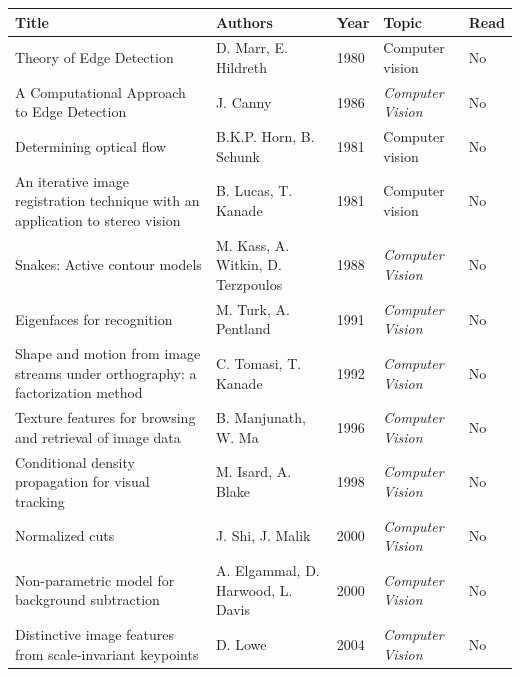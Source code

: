 \documentclass[idxtotoc,hyperref,openany]{labbook} %
\begin{document}
\begin{table}[h!]
\hspace{-2.5cm}
\centering
\renewcommand{\arraystretch}{1.5}
 \small
\begin{tabular}{@{}p{6cm} p{4cm} p{1cm} p{3cm} p{1cm}} \toprule
\textbf{Title}		&	\textbf{Authors}	&	\textbf{Year}		&	\textbf{Topic}		& 	\textbf{Read}\\ \midrule
Theory of Edge Detection	&	D. Marr, E. Hildreth	&	1980	&	Computer vision	& No \\
A Computational Approach to Edge Detection & J. Canny & 1986 & \emph{Computer Vision} & No \\
Determining optical flow	&	B.K.P. Horn, B. Schunk	&	1981	&	Computer vision	&	No \\
An iterative image registration technique with an application to stereo vision	&	B. Lucas, T. Kanade	& 1981 &	Computer vision	&	No \\
Snakes: Active contour models	&	M. Kass, A. Witkin, D. Terzpoulos	&	1988 & \emph{Computer Vision} & No \\
Eigenfaces for recognition & M. Turk, A. Pentland & 1991 & \emph{Computer Vision} & No \\
Shape and motion from image streams under orthography: a factorization method & C. Tomasi, T. Kanade & 1992 & \emph{Computer Vision} & No \\
Texture features for browsing and retrieval of image data & B. Manjunath, W. Ma & 1996 & \emph{Computer Vision} & No\\
Conditional density propagation for visual tracking & M. Isard, A. Blake & 1998 & \emph{Computer Vision} & No \\
Normalized cuts & J. Shi, J. Malik & 2000 & \emph{Computer Vision} & No \\
Non-parametric model for background subtraction & A. Elgammal, D. Harwood, L. Davis & 2000 & \emph{Computer Vision} & No\\
Distinctive image features from scale-invariant keypoints & D. Lowe & 2004 & \emph{Computer Vision} & No
 \\ \bottomrule
\end{tabular}
\end{table}
\end{document}
